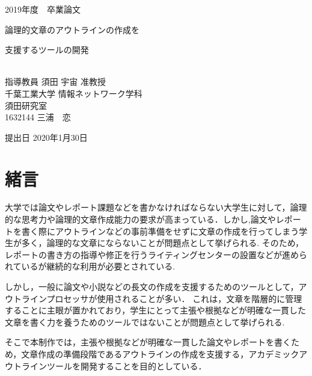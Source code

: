 \documentclass[a4j,12pt]{jarticle}
\begin{document}
\begin{center}
\thispagestyle{empty}
\vspace*{5zh}
\huge
2019年度　卒業論文\\[50pt]
{\Huge 論理的文章のアウトラインの作成を

支援するツールの開発}\\
[80pt]
\huge
指導教員 須田 宇宙 准教授\\[30pt]
千葉工業大学 情報ネットワーク学科\\[10pt]
須田研究室\\[60pt]
1632144 \hspace{70pt} 三浦　恋\\[75pt]
\end{center}
\vspace*{-2cm}
\begin{flushright} 
\huge
提出日 2020年1月30日
\end{flushright}
\large
\newpage
{}
\tableofcontents%
\newpage
{}
\listoffigures
\thispagestyle{empty}
\clearpage
\addtocounter{page}{-1}



\newpage

\section{緒言}

大学では論文やレポート課題などを書かなければならない大学生に対して，論理的な思考力や論理的文章作成能力の要求が高まっている．しかし,論文やレポートを書く際にアウトラインなどの事前準備をせずに文章の作成を行ってしまう学生が多く，論理的な文章にならないことが問題点として挙げられる.
そのため，レポートの書き方の指導や修正を行うライティングセンターの設置などが進められているが継続的な利用が必要とされている.

しかし，一般に論文や小説などの長文の作成を支援するためのツールとして，アウトラインプロセッサが使用されることが多い．
これは，文章を階層的に管理することに主眼が置かれており，学生にとって主張や根拠などが明確な一貫した文章を書く力を養うためのツールではないことが問題点として挙げられる.

そこで本制作では，主張や根拠などが明確な一貫した論文やレポートを書くため，文章作成の準備段階であるアウトラインの作成を支援する，アカデミックアウトラインツールを開発することを目的としている．
\newpage
\end{document}
